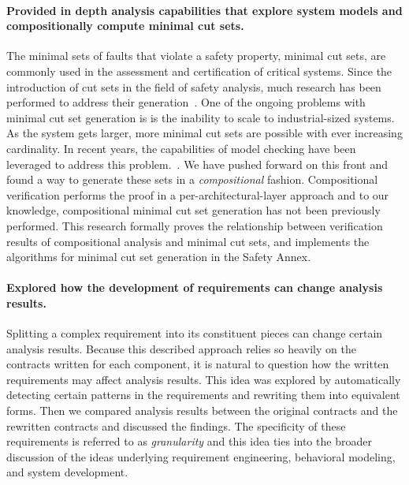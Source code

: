 \paragraph{Provided in depth analysis capabilities that explore system models and compositionally compute minimal cut sets.}
The minimal sets of faults that violate a safety property, minimal cut sets, are commonly used in the assessment and certification of critical systems. Since the introduction of cut sets in the field of safety analysis, much research has been performed to address their generation~\cite{fta:survey,rauzy1993new,historyFTA,Bozzano:2010:DSA:1951720,rausand2003system}. One of the ongoing problems with minimal cut set generation is is the inability to scale to industrial-sized systems. As the system gets larger, more minimal cut sets are possible with ever increasing cardinality. In recent years, the capabilities of model checking have been leveraged to address this problem.~\cite{bieber2002combination,schafer2003combining,fta:survey,contractBasedDesign,symbFTA,DBLP:conf/cav/BozzanoCPJKPRT15}. We have pushed forward on this front and found a way to generate these sets in a \emph{compositional} fashion. Compositional verification performs the proof in a per-architectural-layer approach and to our knowledge, compositional minimal cut set generation has not been previously performed. This research formally proves the relationship between verification results of compositional analysis and minimal cut sets, and implements the algorithms for minimal cut set generation in the Safety Annex.

\paragraph{Explored how the development of requirements can change analysis results.}
Splitting a complex requirement into its constituent pieces can change certain analysis results. Because this described approach relies so heavily on the contracts written for each component, it is natural to question how the written requirements may affect analysis results. This idea was explored by automatically detecting certain patterns in the requirements and rewriting them into equivalent forms. Then we compared analysis results between the original contracts and the rewritten contracts and discussed the findings. The specificity of these requirements is referred to as \emph{granularity} and this idea ties into the broader discussion of the ideas underlying requirement engineering, behavioral modeling, and system development. 

